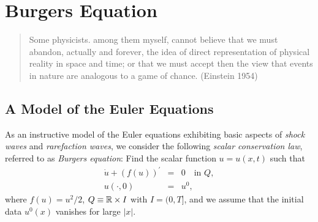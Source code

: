 
\chapter{Burgers Equation}
\small
\begin{quote}
Some physicists. among them myself, cannot believe that we must abandon,
actually and forever, the idea of direct representation of physical reality
in space and time; or that we must accept then the view that events in nature
are analogous to a game of chance. (Einstein 1954)
\end{quote}


\normalsize

\section{A Model of the Euler Equations}

As an instructive model of the 
Euler equations exhibiting basic aspects of
\emph{shock waves} and \emph{rarefaction waves}, 
we consider the following \emph{scalar conservation law}, referred to
as \emph{Burgers equation}:
Find the scalar function $u=u(x,t)$ such that
\begin{equation}\label{burgers}
\begin{array}{rcl}
\dot u +(f(u))^\prime &=&  0\quad\mbox{in }Q, \\
u(\cdot ,0)  &=&  u^0,
\end{array}
\end{equation}
where $f(u)=u^2/2$, $Q\equiv {\mathbb{R}}\times I$ with $I=(0,T]$,  
and we assume that the initial data 
$u^0(x)$ vanishes for large $\vert x\vert$.
 
